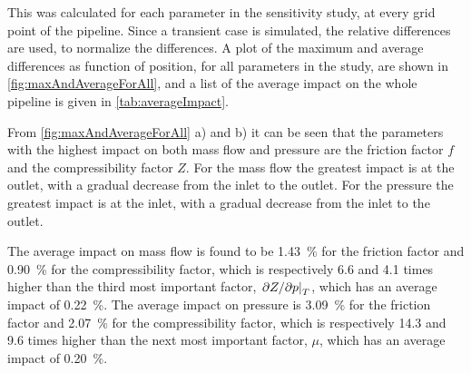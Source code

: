 This was calculated for each parameter in the sensitivity study, at every grid point of the pipeline. Since a transient case is simulated, the relative differences are used, to normalize the differences. %
%
%
A plot of the maximum and average differences as function of position, for all parameters in the study, are shown in \cref{fig:maxAndAverageForAll}, and a list of the average impact on the whole pipeline is given in \cref{tab:averageImpact}. %

From \cref{fig:maxAndAverageForAll} a) and b) it can be seen that the parameters with the highest impact on both mass flow and pressure are the friction factor $f$ and the compressibility factor $Z$. For the mass flow the greatest impact is at the outlet, with a gradual decrease from the inlet to the outlet. For the pressure the greatest impact is at the inlet, with a gradual decrease from the inlet to the outlet. 

%
The average impact on mass flow is found to be \SI{1.43}{\percent} for the friction factor and \SI{0.90}{\percent} for the compressibility factor, %
which is respectively 6.6 and 4.1 times higher than the third most important factor, $\eval{\partial Z/\partial p}_T$, which has an average impact of \SI{0.22}{\percent}. %
%
The average impact on pressure is \SI{3.09}{\percent} for the friction factor and \SI{2.07}{\percent} for the compressibility factor, %
which is respectively 14.3 and 9.6 times higher than the next most important factor, $\mu$, which has an average impact of \SI{0.20}{\percent}. %
%

